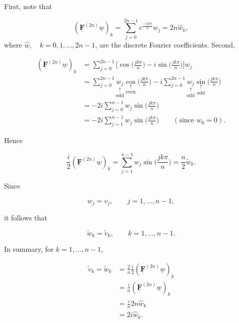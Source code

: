 \documentclass[11pt]{article}
\begin{document}
First, note that

\begin{equation*}
  (\underline{\mathbf{F}}^{(2n)} \underline{w})_k = \sum_{j=0}^{2n-1} e^{\frac{-ijk \pi}{n}} w_j = 2n \hat{w}_k,
\end{equation*}
where $\hat{w}, \quad k=0,1,\ldots,2n-1$, are the discrete Fourier coefficients. Second,

\begin{align*}
  (\underline{\mathbf{F}}^{(2n)} \underline{w})_k &= \sum_{j=0}^{2n-1} \biggl[ \cos \biggl( \frac{j k \pi}{n} \biggr) - i \sin \biggl( \frac{jk \pi}{n} \biggr) \biggr] w_j \\
  &= \sum_{j=0}^{2n-1} \underset{\text{odd}}{\underset{\uparrow}{w_j}} \underset{\text{even}}{\underset{\uparrow}{\cos}} \biggl( \frac{jk \pi}{n} \biggr) - i \sum_{j=0}^{2n-1} \underset{\text{odd}}{\underset{\uparrow}{w_j}} \underset{\text{odd}}{\underset{\uparrow}{\sin}} \biggl( \frac{j k \pi}{n} \biggr) \\
  &= -2i \sum_{j=0}^{n-1} w_j \sin \biggl( \frac{j k \pi}{n} \biggr) \\
  &= -2i \sum_{j=1}^{n-1} w_j \sin \biggl( \frac{j k \pi}{n} \biggr) \qquad (\text{since } w_0=0).
\end{align*}

Hence

\begin{equation*}
  \frac{i}{2} ( \underline{\mathbf{F}}^{(2n)} \underline{w})_k = \sum_{j=1}^{n-1} w_j \sin \biggl( \frac{j k \pi}{n} \biggl) = \frac{n}{2} \widetilde{w}_k.
\end{equation*}

Since 

\begin{equation*}
  w_j=v_j, \qquad j=1,\ldots,n-1,
\end{equation*}

it follows that

\begin{equation*}
  \widetilde{w}_k = \widetilde{v}_k, \qquad k=1,\ldots,n-1.
\end{equation*}

In summary, for $k=1,\ldots,n-1$,

\begin{align*}
  \widetilde{v}_k = \widetilde{w}_k &= \frac{2}{n} \frac{i}{2} (\underline{\mathbf{F}}^{(2n)} \underline{w})_k \\
  &= \frac{i}{n} (\underline{\mathbf{F}}^{(2n)} \underline{w})_k \\
  &= \frac{i}{n} 2n \hat{w}_k \\
  &= 2i \hat{w}_k.
\end{align*}
\end{document}
